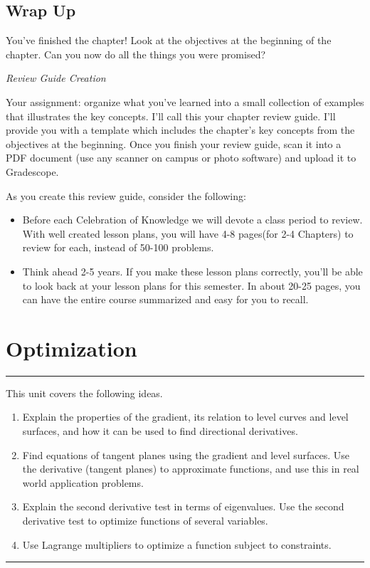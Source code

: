 \documentclass[10pt,]{book}
\theoremstyle{plain}
\theoremstyle{definition}
\theoremstyle{definition}
\theoremstyle{definition}
\theoremstyle{definition}
\newenvironment{objectives}[1]{\noindent\rule{\linewidth}{0.1ex}\newline{\textbf{{\large#1}}\par\smallskip}}{\par\noindent\rule{\linewidth}{0.1ex}\par\smallskip}
\theoremstyle{definition}
\numberwithin{equation}{section}
\begin{document}
\section*{Wrap Up}
You've finished the chapter! Look at the objectives at the beginning of the chapter. Can you now do all the things you were promised?%
\par
\emph{Review Guide Creation}%
\par
Your assignment: organize what you've learned into a small collection of examples that illustrates the key concepts. I'll call this your chapter review guide. I'll provide you with a template which includes the chapter's key concepts from the objectives at the beginning. Once you finish your review guide, scan it into a PDF document (use any scanner on campus or photo software) and upload it to Gradescope. %
\par
As you create this review guide, consider the following: \leavevmode%
\begin{itemize}[label=\textbullet]
\item{}Before each Celebration of Knowledge  we will devote a class period to review. With well created lesson plans, you will have 4-8 pages(for 2-4 Chapters) to review for each, instead of 50-100 problems.%
\item{}Think ahead 2-5 years. If you make these lesson plans correctly, you'll be able to look back at your lesson plans for this semester. In about 20-25 pages, you can have the entire course summarized and easy for you to recall.%
\end{itemize}
%
\typeout{************************************************}
\typeout{************************************************}
\chapter[{Optimization}]{Optimization}\label{chapter-10}
\begin{objectives}{Objectives}\label{objectives-26}
This unit covers the following ideas.%
%
\begin{enumerate}
\item\hypertarget{li-165}{}Explain the properties of the gradient, its relation to level curves and level surfaces, and how it can be used to find directional derivatives.%
\item\hypertarget{li-166}{}Find equations of tangent planes using the gradient and level surfaces. Use the derivative (tangent planes) to approximate functions, and use this in real world application problems.%
\item\hypertarget{li-167}{}Explain the second derivative test in terms of eigenvalues. Use the second derivative test to optimize functions of several variables.%
\item\hypertarget{li-168}{}Use Lagrange multipliers to optimize a function subject to constraints.%
\end{enumerate}
\end{objectives}
\typeout{************************************************}
\typeout{************************************************}
\end{document}
